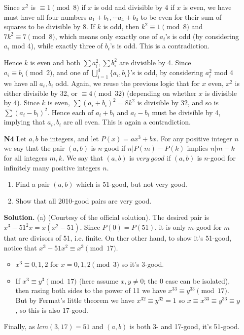 \documentclass[11pt]{article}
\newcommand{\<}{\langle}
\renewcommand{\>}{\rangle}
\begin{document}
\begin{enumerate}
    Since $x^2$ is $\equiv 1\pmod{8}$ if $x$ is odd and divisible by 4 if $x$ is even, 
    we have must have all four numbers 
    $a_1+b_1, \cdots a_4+b_4$ to be even for their sum of squares to be divisible by 8. 
    If $k$ is odd, then $k^2\equiv 1\pmod{8}$ and $7k^2\equiv 7\pmod{8}$, 
    which means only exactly one of $a_i$'s is odd (by considering $a_i$ mod 4), 
    while exactly three of $b_i$'s is odd. 
    This is a contradiction. 
    
    Hence $k$ is even and both $\sum a_i^2, \sum b_i^2$ are divisible by 4. 
    Since $a_i\equiv b_i\pmod{2}$, and one of $\bigcup_{i=1}^4 \{a_i, b_i\}$'s is odd, 
    by considering $a_i^2$ mod 4 we have all $a_i, b_i$ odd. 
    Again, we reuse the previous logic that for $x$ even, $x^2$ is either divisible by 32, 
    or $\equiv 4\pmod{32}$ 
    (depending on whether $x$ is divisible by 4). 
    Since $k$ is even, $\sum (a_i+b_i)^2=8k^2$ is divisible by 32, 
    and so is $\sum (a_i - b_i)^2$. 
    Hence each of $a_i + b_i$ and $a_i - b_i$ must be divisible by 4, implying that $a_i, b_i$ are all even. 
    This is again a contradiction. 
	
	\item [\textbf{N4}]Let $a, b$ be integers, and let $P(x) = ax^3+bx.$ For any positive integer $n$ we say that the pair $(a,b)$ is $n$-good if $n | P(m)-P(k)$ implies $n | m - k$ for all integers $m, k.$ We say that $(a,b)$ is $very \ good$ if $(a,b)$ is $n$-good for infinitely many positive integers $n.$
	\begin{enumerate}
		\item Find a pair $(a,b)$ which is 51-good, but not very good.
		\item Show that all 2010-good pairs are very good.
		\end{enumerate}
	
	\textbf{Solution.} 
	(a) (Courtesy of the official solution). The desired pair is $x^3-51^2x=x(x^2-51)$. Since $P(0)=P(51)$, it is only $m$-good for $m$ that are divisors of 51, i.e. finite. 
	On ther other hand, to show it's 51-good, notice that $x^3-51x^2\equiv x^3\pmod{17}$. 
	\begin{itemize}
		\item $x^3\equiv 0, 1, 2$ for $x=0, 1, 2\pmod{3}$ so it's 3-good. 
		\item If $x^3\equiv y^3\pmod{17}$ (here assume $x, y\neq 0$; the 0 case can be isolated), then rasing both sides to the power of 11 we have $x^{33}\equiv y^{33}\pmod{17}$. But by Fermat's little theorem we have $x^{32}\equiv y^{32}=1$ so $x\equiv x^{33}\equiv y^{33}\equiv y$, so this is also 17-good. 
	\end{itemize}
	Finally, as $lcm(3, 17)=51$ and $(a, b)$ is both 3- and 17-good, it's 51-good. 
	

\end{enumerate}
\end{document}
